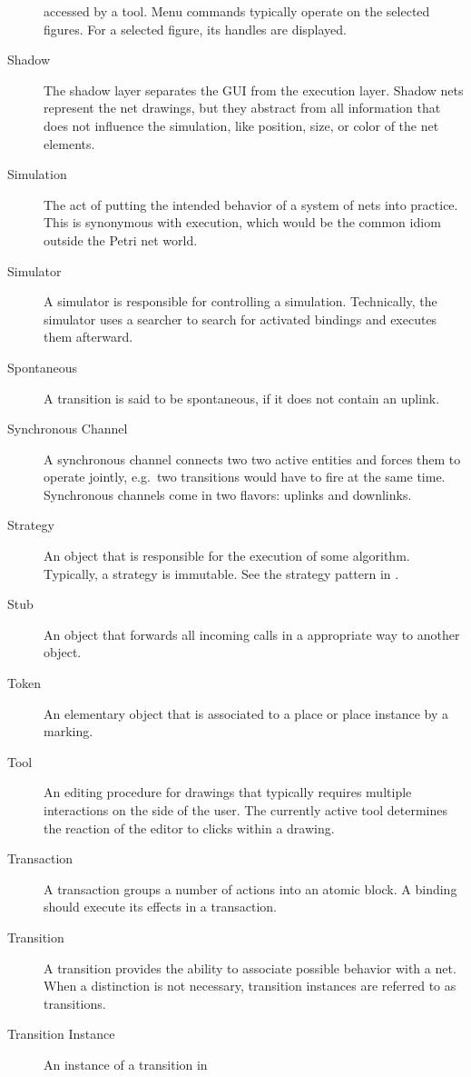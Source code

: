 \begin{description}
  accessed by a \see tool. Menu commands typically operate on
  the selected \see figures. For a selected \see figure,
  its \see handles are displayed.
\item[Shadow] The shadow layer separates the GUI from the
  execution layer. Shadow nets represent the net drawings, 
  but they abstract from all information that does not influence
  the simulation, like position, size, or color of the net elements.
\item[Simulation] The act of putting the intended behavior of a
  system of \see nets into practice. This is synonymous with execution,
  which would be the common idiom outside the Petri net world.
\item[Simulator] A simulator is responsible for controlling a
  \see simulation. Technically, the simulator uses a
  \see searcher to search for activated \see bindings and
  executes them afterward.
\item[Spontaneous] A transition is said to be spontaneous, if
  it does not contain an \see uplink.
\item[Synchronous Channel] A synchronous channel connects two
  two active entities and forces them to operate jointly, 
  e.g.~two transitions would have to \see fire at the same time.
  Synchronous channels come in two flavors: \see uplinks and
  \see downlinks.
\item[Strategy] An object that is responsible for the execution
  of some algorithm. Typically, a strategy is immutable.
  See the strategy pattern in \cite{Gamma95}.
\item[Stub] An object that forwards all incoming calls in a appropriate
  way to another object.
\item[Token] An elementary object that is associated to a \see place
  or \see place instance by a \see marking.
\item[Tool] An editing procedure for \see drawings that typically
  requires multiple interactions on the side of the user. The currently
  active tool determines the reaction of the \see editor
  to clicks within a \see drawing.
\item[Transaction] A transaction groups a number of actions into an
  atomic block. A \see binding should execute its effects in a
  transaction.
\item[Transition] A transition provides the ability to associate
  possible behavior with a \see net. When a distinction is not necessary,
  \see transition instances are referred to as transitions.
\item[Transition Instance] An instance of a \see transition in

\end{description}
